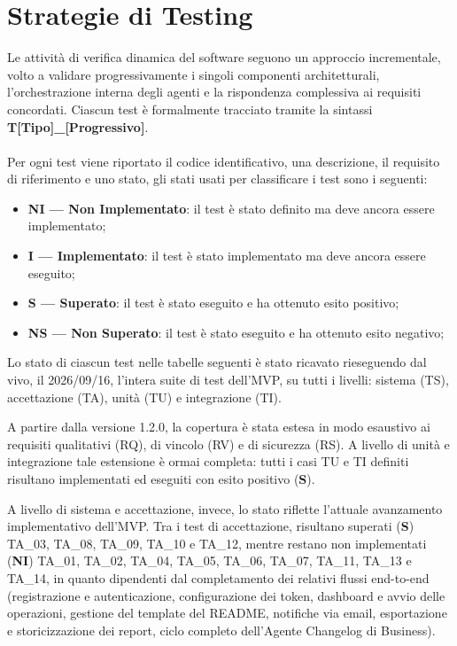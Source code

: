 \documentclass[12pt, a4paper]{article}
\begin{document}
\section{Strategie di Testing}
Le attività di verifica dinamica del software seguono un approccio incrementale, volto a validare progressivamente i singoli componenti architetturali, l'orchestrazione interna degli agenti e la rispondenza complessiva ai requisiti concordati. Ciascun test è formalmente tracciato tramite la sintassi \textbf{T[Tipo]\_[Progressivo]}.
\\ \\
Per ogni test viene riportato il codice identificativo, una descrizione, il requisito di riferimento e uno stato, gli stati usati per classificare i test sono i seguenti:
\begin{itemize}
    \item \textbf{NI — Non Implementato}: il test è stato definito ma deve ancora essere implementato;
    \item \textbf{I — Implementato}: il test è stato implementato ma deve ancora essere eseguito;
    \item \textbf{S — Superato}: il test è stato eseguito e ha ottenuto esito positivo;
    \item \textbf{NS — Non Superato}: il test è stato eseguito e ha ottenuto esito negativo;
\end{itemize}

Lo stato di ciascun test nelle tabelle seguenti è stato ricavato rieseguendo dal vivo, il 2026/09/16, l'intera suite di test dell'MVP, su tutti i livelli: sistema (TS), accettazione (TA), unità (TU) e integrazione (TI).

A partire dalla versione 1.2.0, la copertura è stata estesa in modo esaustivo ai requisiti qualitativi (RQ), di vincolo (RV) e di sicurezza (RS). A livello di unità e integrazione tale estensione è ormai completa: tutti i casi TU e TI definiti risultano implementati ed eseguiti con esito positivo (\textbf{S}).

A livello di sistema e accettazione, invece, lo stato riflette l'attuale avanzamento implementativo dell'MVP. Tra i test di accettazione, risultano superati (\textbf{S}) TA\_03, TA\_08, TA\_09, TA\_10 e TA\_12, mentre restano non implementati (\textbf{NI}) TA\_01, TA\_02, TA\_04, TA\_05, TA\_06, TA\_07, TA\_11, TA\_13 e TA\_14, in quanto dipendenti dal completamento dei relativi flussi end-to-end (registrazione e autenticazione, configurazione dei token, dashboard e avvio delle operazioni, gestione del template del README, notifiche via email, esportazione e storicizzazione dei report, ciclo completo dell'Agente Changelog di Business).
\end{document}
